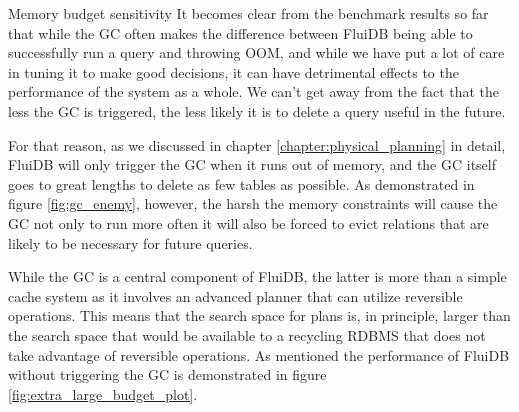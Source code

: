\begin{corrected}{Memory budget sensitivity}
  It becomes clear from the benchmark results so far that while the GC
  often makes the difference between FluiDB being able to successfully
  run a query and throwing OOM, and while we have put a lot of care in
  tuning it to make good decisions, it can have detrimental effects to
  the performance of the system as a whole. We can't get away from the
  fact that the less the GC is triggered, the less likely it is to
  delete a query useful in the future.

  For that reason, as we discussed in chapter
  \ref{chapter:physical_planning} in detail, FluiDB will only trigger
  the GC when it runs out of memory, and the GC itself goes to great
  lengths to delete as few tables as possible. As demonstrated in
  figure \ref{fig:gc_enemy}, however, the harsh the memory constraints
  will cause the GC not only to run more often it will also be forced
  to evict relations that are likely to be necessary for future
  queries.

  While the GC is a central component of FluiDB, the latter is more than
  a simple cache system as it involves an advanced planner that can
  utilize reversible operations. This means that the search space for
  plans is, in principle, larger than the search space that would be
  available to a recycling RDBMS that does not take advantage of
  reversible operations. As mentioned the performance of FluiDB without
  triggering the GC is demonstrated in figure
  \ref{fig:extra_large_budget_plot}.
\end{corrected}


